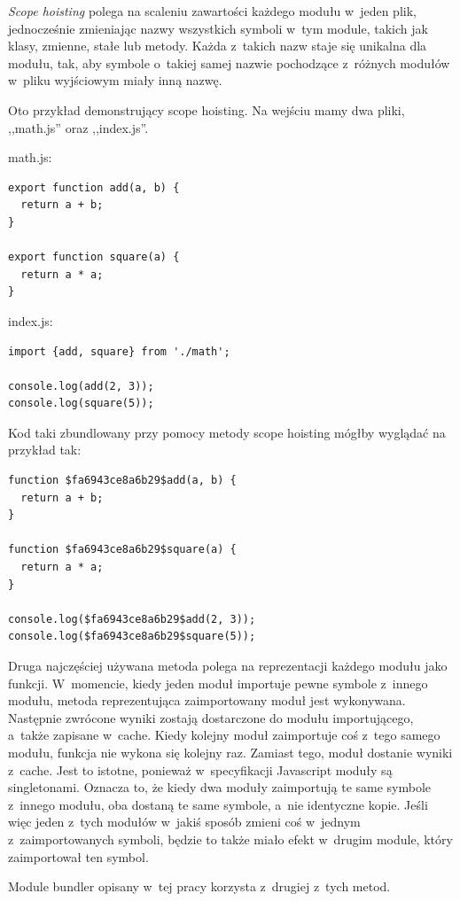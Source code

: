 \documentclass{SGGW-thesis}
\begin{document}
\emph{Scope hoisting} polega na scaleniu zawartości każdego modułu w~jeden plik, jednocześnie zmieniając nazwy wszystkich symboli w~tym module, takich jak klasy, zmienne, stałe lub metody. Każda z~takich nazw staje się unikalna dla modułu, tak, aby symbole o~takiej samej nazwie pochodzące z~różnych modułów w~pliku wyjściowym miały inną nazwę.

Oto przykład demonstrujący scope hoisting. Na wejściu mamy dwa pliki, ,,math.js'' oraz ,,index.js''.

math.js:
\begin{verbatim}
export function add(a, b) {
  return a + b;
}

export function square(a) {
  return a * a;
}
\end{verbatim}

index.js:
\begin{verbatim}
import {add, square} from './math';

console.log(add(2, 3));
console.log(square(5));
\end{verbatim}

Kod taki zbundlowany przy pomocy metody scope hoisting mógłby wyglądać na przykład tak:

\begin{verbatim}
function $fa6943ce8a6b29$add(a, b) {
  return a + b;
}

function $fa6943ce8a6b29$square(a) {
  return a * a;
}

console.log($fa6943ce8a6b29$add(2, 3));
console.log($fa6943ce8a6b29$square(5));
\end{verbatim}

Druga najczęściej używana metoda polega na reprezentacji każdego modułu jako funkcji. W~momencie, kiedy jeden moduł importuje pewne symbole z~innego modułu, metoda reprezentująca zaimportowany moduł jest wykonywana. Następnie zwrócone wyniki zostają dostarczone do modułu importującego, a~także zapisane w~cache. Kiedy kolejny moduł zaimportuje coś z~tego samego modułu, funkcja nie wykona się kolejny raz. Zamiast tego, moduł dostanie wyniki z~cache. Jest to istotne, ponieważ w~specyfikacji Javascript moduły są singletonami\cite{object_oriented_javascript}. Oznacza to, że kiedy dwa moduły zaimportują te same symbole z~innego modułu, oba dostaną te same symbole, a~nie identyczne kopie. Jeśli więc jeden z~tych modułów w~jakiś sposób zmieni coś w~jednym z~zaimportowanych symboli, będzie to także miało efekt w~drugim module, który zaimportował ten symbol.

Module bundler opisany w~tej pracy korzysta z~drugiej z~tych metod.
\end{document}
